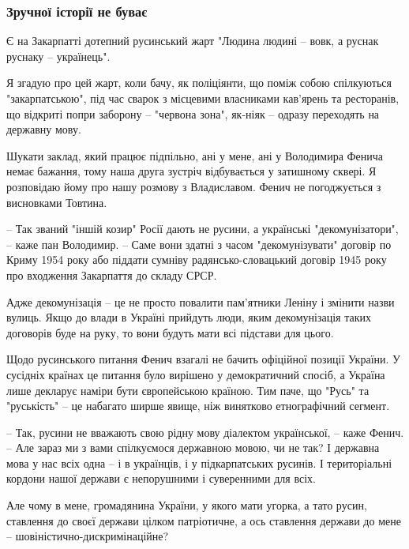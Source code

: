  
 
 

\subsubsection{Зручної історії не буває}

Є на Закарпатті дотепний русинський жарт "Людина людині – вовк, а руснак
руснаку – українець".

Я згадую про цей жарт, коли бачу, як поліціянти, що поміж собою спілкуються
"закарпатською", під час сварок з місцевими власниками кав’ярень та ресторанів,
що відкриті попри заборону – "червона зона", як-ніяк – одразу переходять на
державну мову.

Шукати заклад, який працює підпільно, ані у мене, ані у Володимира Фенича немає
бажання, тому наша друга зустріч відбувається у затишному сквері. Я розповідаю
йому про нашу розмову з Владиславом. Фенич не погоджується з висновками
Товтина.  

– Так званий "іншій козир" Росії дають не русини, а українські
"декомунізатори", – каже пан Володимир. – Саме вони здатні з часом
"декомунізувати" договір по Криму 1954 року або піддати сумніву
радянсько-словацький договір 1945 року про входження Закарпаття до складу СРСР.

Адже декомунізація – це не просто повалити пам’ятники Леніну і змінити назви
вулиць. Якщо до влади в Україні прийдуть люди, яким декомунізація таких
договорів буде на руку, то вони будуть мати всі підстави для цього.

Щодо русинського питання Фенич взагалі не бачить офіційної позиції України. У
сусідніх країнах це питання було вирішено у демократичний спосіб, а Україна
лише декларує наміри бути європейською країною. Тим паче, що "Русь" та
"руськість" – це набагато ширше явище, ніж винятково етнографічний сегмент.

– Так, русини не вважають свою рідну мову діалектом української, – каже Фенич.
– Але зараз ми з вами спілкуємося державною мовою, чи не так? І державна мова у
нас всіх одна – і в українців, і у підкарпатських русинів. І територіальні
кордони нашої держави є непорушними і суверенними для всіх.

Але чому в мене, громадянина України, у якого мати угорка, а тато русин,
ставлення до своєї держави цілком патріотичне, а ось ставлення держави до мене
– шовіністично-дискримінаційне?

